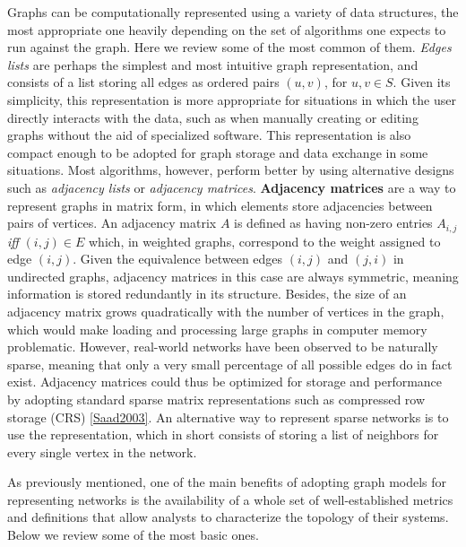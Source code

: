 Graphs can be computationally represented using a variety of data structures, the most appropriate one heavily depending on the set of algorithms one expects to run against the graph.
Here we review some of the most common of them.
%
\textit{Edges lists} are perhaps the simplest and most intuitive graph representation, and consists of a list storing all edges as ordered pairs $(u,v)$, for $u,v \in S$.
Given its simplicity, this representation is more appropriate for situations in which the user directly interacts with the data, such as when manually creating or editing graphs without the aid of specialized software. 
This representation is also compact enough to be adopted for graph storage and data exchange in some situations.
%
Most algorithms, however, perform better by using alternative designs such as \textit{adjacency lists} or \textit{adjacency matrices}. 
%
\textbf{Adjacency matrices} are a way to represent graphs in matrix form, in which elements store adjacencies between pairs of vertices.
An adjacency matrix $A$ is defined as having non-zero entries $A_{i,j}$\textit{ iff } $(i,j)\in E$ which, in weighted graphs, correspond to the weight assigned to edge $(i,j)$.
Given the equivalence between edges $(i,j)$ and $(j,i)$ in undirected graphs, adjacency matrices in this case are always symmetric, meaning information is stored redundantly in its structure.
%
Besides, the size of an adjacency matrix grows quadratically with the number of vertices in the graph, which would make loading and processing large graphs in computer memory problematic.
However, real-world networks have been observed to be naturally sparse, meaning that only a very small percentage of all possible edges do in fact exist.
Adjacency matrices could thus be optimized for storage and performance by adopting standard sparse matrix representations such as compressed row storage (CRS) \ref{Saad2003}.
An alternative way to represent sparse networks is to use the  representation, which in short consists of storing a list of neighbors for every single vertex in the network. 


As previously mentioned, one of the main benefits of adopting graph models for representing networks is the availability of a whole set of well-established metrics and definitions that allow analysts to characterize the topology of their systems. 
Below we review some of the most basic ones.

